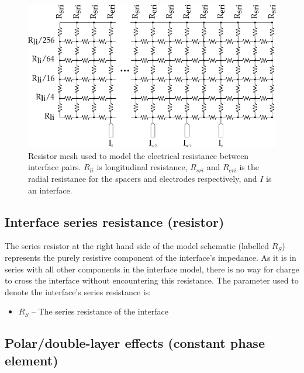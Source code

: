     \begin{figure}
      \centering
      \includegraphics{content/pt2/07-InterfaceModel/graphics/resistorMesh}
      \caption{\label{fig:pt2-ResistorMesh}Resistor mesh used to model the electrical resistance between interface pairs. $R_{li}$ is longitudinal resistance, $R_{sri}$ and $R_{eri}$ is the radial resistance for the spacers and electrodes respectively, and $I$ is an interface.}
    \end{figure}


  \subsection{Interface series resistance (resistor)}


    The series resistor at the right hand side of the model schematic (labelled $R_{S}$) represents the purely resistive component of the interface's impedance.
    As it is in series with all other components in the interface model, there is no way for charge to cross the interface without encountering this resistance.
    The parameter used to denote the interface's series resistance is:
    \begin{itemize}
      \item $R_S$ -- The series resistance of the interface
    \end{itemize}

  \subsection{Polar/double-layer effects (constant phase element)}

